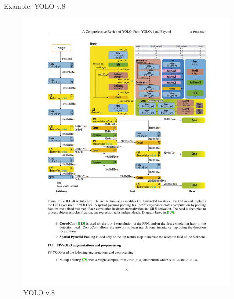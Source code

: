 \documentclass[xcolor=pdftex,dvipsnames,table]{beamer}
\begin{document}
\begin{frame}{Example: YOLO v.8}
\begin{figure}[htb]
   \centering
   \includegraphics[width=.7\textwidth]{../graphics/YOLO_v8.pdf}
   \caption{YOLO v.8}
\end{figure}
\end{frame}
\end{document}
